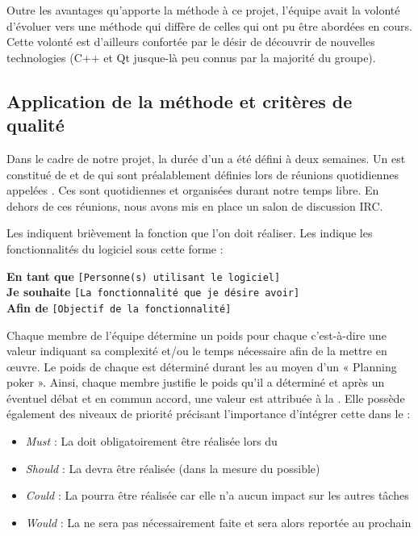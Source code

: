 Outre les avantages qu'apporte la méthode  à ce projet, l'équipe avait la volonté d’évoluer vers une méthode qui diffère de celles qui ont pu
être abordées en cours. Cette volonté est d’ailleurs confortée par le désir de découvrir  de nouvelles technologies (C++ et Qt jusque-là peu connus
par la majorité du groupe). 


\subsection{Application de la méthode  et critères de qualité}
Dans le cadre de notre projet, la durée d'un  a été défini à deux semaines. Un  est constitué de  et de 
 qui sont préalablement définies lors de réunions quotidiennes appelées . Ces  sont quotidiennes et organisées durant notre temps libre. En dehors de ces réunions, nous avons mis en place un salon
de discussion IRC.  

Les  indiquent brièvement la fonction que l'on doit réaliser. Les  indique les fonctionnalités du logiciel sous cette forme :

\begin{exemple}
	\textbf{En tant que} \texttt{[Personne(s) utilisant le logiciel]}\\
	\textbf{Je souhaite} \texttt{[La fonctionnalité que je désire avoir]}\\
	\textbf{Afin de} \texttt{[Objectif de la fonctionnalité]}
\end{exemple}

Chaque membre de l'équipe détermine un poids pour chaque  c'est-à-dire une valeur indiquant sa complexité et/ou le temps nécessaire afin de la mettre en œuvre. Le poids de chaque  est déterminé durant les  au moyen d’un « Planning poker ».  Ainsi, chaque membre justifie le poids qu'il a déterminé et après un éventuel débat et en commun accord, une valeur est attribuée à la . Elle possède également des niveaux de priorité précisant
l'importance d’intégrer cette  dans le : 

\begin{itemize}
	\item \textit{Must} : La  doit obligatoirement être réalisée lors du 
	\item \textit{Should} : La  devra être réalisée (dans la mesure du possible)
	\item \textit{Could} : La  pourra être réalisée car elle n’a aucun impact sur les autres tâches
	\item \textit{Would} : La  ne sera pas nécessairement faite et sera alors reportée au prochain 
\end{itemize}

